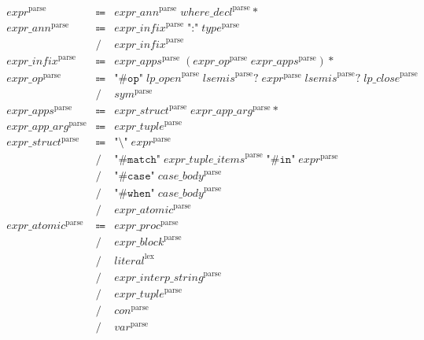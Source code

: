 \begin{align*}
    \begin{array}{rcll}
        \mathit{expr}^\mathrm{parse}
        &\Coloneq &\mathit{expr\_ann}^\mathrm{parse}\; \mathit{where\_decl}^\mathrm{parse}{*} \\
        \mathit{expr\_ann}^\mathrm{parse}
        &\Coloneq &\mathit{expr\_infix}^\mathrm{parse}\; \texttt{":"}\; \mathit{type}^\mathrm{parse} \\
        &\mathrel{/} &\mathit{expr\_infix}^\mathrm{parse} \\
        \mathit{expr\_infix}^\mathrm{parse}
        &\Coloneq &\mathit{expr\_apps}^\mathrm{parse}\; (\mathit{expr\_op}^\mathrm{parse}\; \mathit{expr\_apps}^\mathrm{parse}){*} \\
        \mathit{expr\_op}^\mathrm{parse}
        &\Coloneq &\texttt{"\#op"}\; \mathit{lp\_open}^\mathrm{parse}\; \mathit{lsemis}^\mathrm{parse}{?}\; \mathit{expr}^\mathrm{parse}\; \mathit{lsemis}^\mathrm{parse}{?}\; \mathit{lp\_close}^\mathrm{parse} \\
        &\mathrel{/} &\mathit{sym}^\mathrm{parse} \\
        \mathit{expr\_apps}^\mathrm{parse}
        &\Coloneq &\mathit{expr\_struct}^\mathrm{parse}\; \mathit{expr\_app\_arg}^\mathrm{parse}{*} \\
        \mathit{expr\_app\_arg}^\mathrm{parse}
        &\Coloneq &\mathit{expr\_tuple}^\mathrm{parse} \\
        \mathit{expr\_struct}^\mathrm{parse}
        &\Coloneq &\texttt{"\textbackslash"}\; \mathit{expr}^\mathrm{parse} \\
        &\mathrel{/} &\texttt{"\#match"}\; \mathit{expr\_tuple\_items}^\mathrm{parse}\; \texttt{"\#in"}\; \mathit{expr}^\mathrm{parse} \\
        &\mathrel{/} &\texttt{"\#case"}\; \mathit{case\_body}^\mathrm{parse} \\
        &\mathrel{/} &\texttt{"\#when"}\; \mathit{case\_body}^\mathrm{parse} \\
        &\mathrel{/} &\mathit{expr\_atomic}^\mathrm{parse} \\
        \mathit{expr\_atomic}^\mathrm{parse}
        &\Coloneq &\mathit{expr\_proc}^\mathrm{parse} \\
        &\mathrel{/} &\mathit{expr\_block}^\mathrm{parse} \\
        &\mathrel{/} &\mathit{literal}^\mathrm{lex} \\
        &\mathrel{/} &\mathit{expr\_interp\_string}^\mathrm{parse} \\
        &\mathrel{/} &\mathit{expr\_tuple}^\mathrm{parse} \\
        &\mathrel{/} &\mathit{con}^\mathrm{parse} \\
        &\mathrel{/} &\mathit{var}^\mathrm{parse}
    \end{array}
\end{align*}

